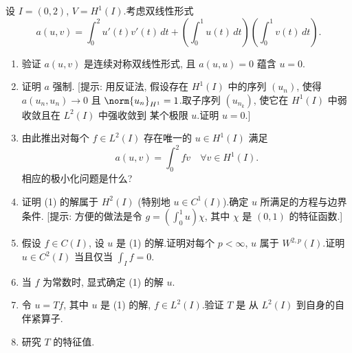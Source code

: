\begin{exercise}
\label{exer:8.25}
设 $I=(0,2)$, $V=H^1(I)$.考虑双线性形式
\begin{equation*}
a(u,v)=\int_0^2u'(t)v'(t)\,dt
+\left(\int_0^1u(t)\,dt\right)\left(\int_0^1v(t)\,dt\right).
\end{equation*}
\begin{enumerate}[label=\arabic*., leftmargin=2.2em, itemsep=0.3em]
	\item 验证 $a(u,v)$ 是连续对称双线性形式, 且 $a(u,u)=0$ 蕴含 $u=0$.
	\item 证明 $a$ 强制.
	      [提示: 用反证法, 假设存在 $H^1(I)$ 中的序列 $(u_n)$, 使得
	      $a(u_n,u_n)\to0$ 且 $\norm{u_n}_{H^1}=1$.取子序列
	      $(u_{n_k})$, 使它在 $H^1(I)$ 中弱收敛且在 $L^2(I)$ 中强收敛到
	      某个极限 $u$.证明 $u=0$.]
	\item 由此推出对每个 $f\in L^2(I)$ 存在唯一的 $u\in H^1(I)$ 满足
	      \begin{equation}
	      a(u,v)=\int_0^2fv\quad\forall v\in H^1(I).
	      \tag{1}
	      \end{equation}
	      相应的极小化问题是什么?
	\item 证明 (1) 的解属于 $H^2(I)$ (特别地 $u\in C^1(I)$).确定 $u$
	      所满足的方程与边界条件.
	      [提示: 方便的做法是令 $g=(\int_0^1u)\chi$, 其中 $\chi$ 是
	      $(0,1)$ 的特征函数.]
	\item 假设 $f\in C(I)$, 设 $u$ 是 (1) 的解.证明对每个 $p<\infty$,
	      $u$ 属于 $W^{2,p}(I)$.证明 $u\in C^2(I)$ 当且仅当
	      $\int_If=0$.
	\item 当 $f$ 为常数时, 显式确定 (1) 的解 $u$.
	\item 令 $u=Tf$, 其中 $u$ 是 (1) 的解, $f\in L^2(I)$.验证 $T$ 是
	      从 $L^2(I)$ 到自身的自伴紧算子.
	\item 研究 $T$ 的特征值.
\end{enumerate}
\end{exercise}

